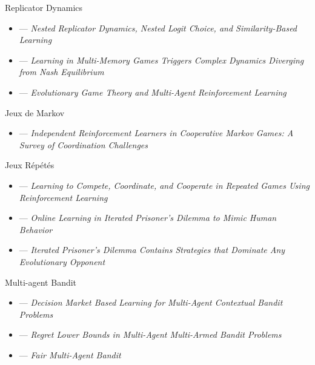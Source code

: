 \documentclass[aspectratio=169,xcolor=dvipsnames]{beamer}
\begin{document}
\begin{frame}{Replicator Dynamics}
\begin{itemize}
    \item \citet{mertikopoulos_nested_2024} --- \textit{Nested Replicator Dynamics, Nested Logit Choice, and Similarity-Based Learning}
    \item \citet{fujimoto_learning_2023} --- \textit{Learning in Multi-Memory Games Triggers Complex Dynamics Diverging from Nash Equilibrium}
    \item \citet{tuyls_evolutionary_2005} --- \textit{Evolutionary Game Theory and Multi-Agent Reinforcement Learning}
\end{itemize}
\end{frame}

\begin{frame}{Jeux de Markov}
\begin{itemize}
    \item \citet{matignon_independent_2012} --- \textit{Independent Reinforcement Learners in Cooperative Markov Games: A Survey of Coordination Challenges}
\end{itemize}
\end{frame}

\begin{frame}{Jeux Répétés}
\begin{itemize}
    \item \citet{crandall_learning_2011} --- \textit{Learning to Compete, Coordinate, and Cooperate in Repeated Games Using Reinforcement Learning}
    \item \citet{lin_online_2022} --- \textit{Online Learning in Iterated Prisoner’s Dilemma to Mimic Human Behavior}
    \item \citet{press_iterated_2012} --- \textit{Iterated Prisoner’s Dilemma Contains Strategies that Dominate Any Evolutionary Opponent}
\end{itemize}
\end{frame}

\begin{frame}{Multi-agent Bandit}
\begin{itemize}
    \item \citet{wang_decision_2022} --- \textit{Decision Market Based Learning for Multi-Agent Contextual Bandit Problems}
    \item \citet{xu_regret_2023} --- \textit{Regret Lower Bounds in Multi-Agent Multi-Armed Bandit Problems}
    \item \citet{leshem_fair_2024} --- \textit{Fair Multi-Agent Bandit}
\end{itemize}
\end{frame}
\end{document}
